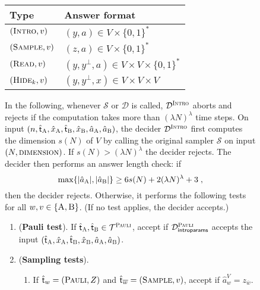 \documentclass[11pt]{article}
\theoremstyle{definition}
\newcommand{\sampler}{\mathcal{S}}
\newcommand{\decider}{\mathcal{D}}
\newcommand{\type}{\mathcal{T}}
\newcommand{\gamestyle}[1]{\ensuremath{\textsc{#1}}\xspace}
\newcommand{\pauli}{\gamestyle{Pauli}}
\newcommand{\intro}{\gamestyle{Intro}}
\newcommand{\labelstyle}[1]{\ensuremath{\textsc{#1}}\xspace}
\newcommand{\tvarstyle}[1]{\mathsf{#1}}
\newcommand{\tvar}{\ensuremath{\tvarstyle{t}}}
\newcommand{\trole}{\ensuremath{v}} %
\newcommand{\alice}{\labelstyle{A}}
\newcommand{\bob}{\labelstyle{B}}
\newcommand{\typestyle}[1]{\ensuremath{\textsc{#1}}\xspace}
\newcommand{\Pauli}{\typestyle{Pauli}}
\newcommand{\Sample}{\typestyle{Sample}}
\newcommand{\Read}{\typestyle{Read}}
\newcommand{\Hide}[1]{\typestyle{Hide}_{#1}}
\newcommand{\Introspect}{\typestyle{Intro}}
\newcommand{\AB}{\{\alice, \bob\}}
\newcommand{\introparams}{\mathsf{introparams}}
\newenvironment{gamespec}{
  \begin{mdframed}[style=figstyle]}{
  \end{mdframed}}
\begin{document}
\begin{figure}[!htbp]
  \begin{gamespec}
    \begin{table}[H]
      \centering
      \small
      \begin{tabularx}{.7\textwidth}{l X}
        \toprule
        Type \hspace{6em} & Answer format\\
        \midrule
        $(\Introspect, \trole)$ & $(y,a) \in V \times \{0,1\}^*$ \\
        $(\Sample, \trole)$ &  $(z,a) \in V \times \{0,1\}^*$ \\
        $(\Read, \trole)$ & $(y,y^{\perp},a) \in V \times V \times \{0,1\}^*$\\
        $(\Hide{k}, \trole)$ & $(y,y^{\perp},x) \in V \times V \times V$\\
        \bottomrule
      \end{tabularx}
    \end{table}
    In the following, whenever $\sampler$ or $\decider$ is called,
    $\decider^\intro$ aborts and rejects if the computation takes more than
    $(\lambda N)^\lambda$ time steps.
    On input $(n, \hat{\tvar}_\alice, \hat{x}_\alice, \hat{\tvar}_\bob,
    \hat{x}_\bob, \hat{a}_\alice, \hat{a}_\bob)$, the decider $\decider^\intro$
    first computes the dimension $s(N)$ of $V$ by calling the original sampler
    $\sampler$ on input $(N,\gamestyle{dimension})$.
    If $s(N) > (\lambda N)^\lambda$ the decider rejects.
    The decider then performs an answer length check: if
    \begin{equation}\label{eq:a-length-bound}
      \max \{ |\hat{a}_\alice|, |\hat{a}_\bob| \} \geq
      6s(N) + 2(\lambda N)^\lambda+3\;,
    \end{equation}
    then the decider rejects.
    Otherwise, it performs the following tests for all $w,\trole \in \AB$.
    (If no test applies, the decider accepts.) 
    
    \begin{enumerate}[itemsep=2pt, parsep=2pt]
    \item (\textbf{Pauli test}).
      \label{enu:pauli}
      If $\hat{\tvar}_\alice, \hat{\tvar}_\bob \in \type^\pauli$, accept if
      $\decider^\pauli_\introparams$ accepts the input $(\hat{\tvar}_\alice,
      \hat{x}_\alice, \hat{\tvar}_\bob, \hat{x}_\bob, \hat{a}_\alice,
      \hat{a}_\bob)$.
    \item (\textbf{Sampling tests}).
      \label{enu:sampling}
      \begin{enumerate}
      \item If $\hat{\tvar}_w = (\Pauli,Z)$ and $\hat{\tvar}_{\overline{w}} =
        (\Sample, \trole)$, accept if $\hat{a}_w^V = z_{\overline{w}}$.
        \label{enu:sampling-pauli}


\end{enumerate}
\end{enumerate}
\end{gamespec}
\end{figure}
\end{document}
